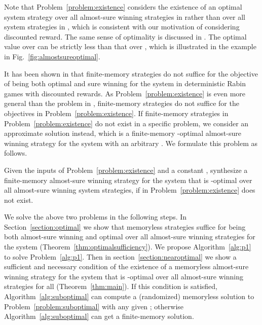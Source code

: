 \documentclass[runningheads,a4paper]{llncs}
\begin{document}
Note that Problem~\ref{problem:existence} considers the existence of an optimal system strategy over all almost-sure winning strategies in  rather than over all system strategies in , which is consistent with our motivation of considering discounted reward. The same sense of optimality is discussed in \cite{wen2015correct}. The optimal value over  can be strictly less than that over , which is illustrated in the example in Fig.~\ref{fig:almostsureoptimal}. 



It has been shown in \cite{wen2015correct} that finite-memory strategies do not suffice for the objective of being both optimal and sure winning for the system in deterministic Rabin games with discounted rewards. As Problem~\ref{problem:existence} is even more general than the problem in \cite{wen2015correct}, finite-memory strategies do not suffice for the objectives in Problem~\ref{problem:existence}. If finite-memory strategies in Problem~\ref{problem:existence} do not exist in a specific problem, we consider an approximate solution instead, which is a finite-memory -optimal almost-sure winning strategy for the system with an arbitrary . We formulate this problem as follows.

\begin{problem}
Given the inputs of Problem~\ref{problem:existence} and a constant , synthesize a finite-memory almost-sure winning strategy  for the system that is -optimal over all almost-sure winning system strategies, if  in Problem~\ref{problem:existence} does not exist. 
\label{problem:suboptimal}
\end{problem}



We solve the above two problems in the following steps. In Section~\ref{section:optimal} we show that memoryless strategies suffice for being both almost-sure winning and optimal over all almost-sure winning strategies for the system (Theorem~\ref{thm:optimalsufficiency}). We propose Algorithm~\ref{alg:p1} to solve Problem~\ref{alg:p1}. Then in section~\ref{section:nearoptimal} we show a sufficient and necessary condition of the existence of a memoryless almost-sure winning strategy for the system that is -optimal over all almost-sure winning strategies for all  (Theorem~\ref{thm:main}). If this condition is satisfied, Algorithm~\ref{alg:suboptimal} can compute a (randomized) memoryless solution to Problem~\ref{problem:suboptimal} with any given ; otherwise Algorithm~\ref{alg:suboptimal} can get a finite-memory solution. 
\end{document}
